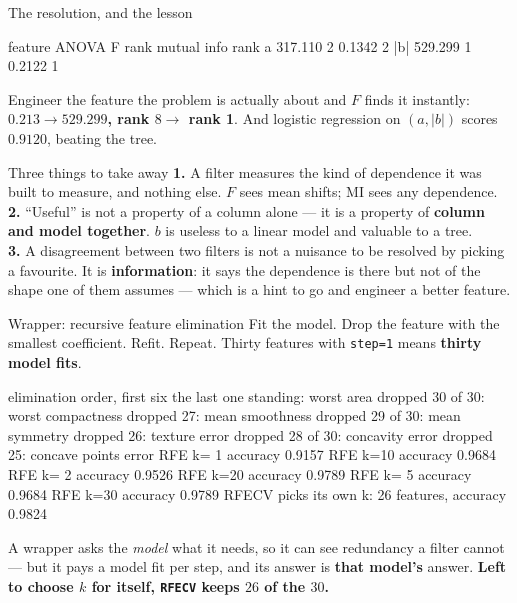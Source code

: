\documentclass[aspectratio=169]{beamer}
\begin{document}
\begin{frame}[fragile,shrink=6]{The resolution, and the lesson}
\begin{outblk}
feature             ANOVA F     rank  mutual info     rank
a                   317.110        2       0.1342        2
|b|                 529.299        1       0.2122        1
\end{outblk}
\vspace{0.1em}
Engineer the feature the problem is actually about and $F$ finds it
instantly: \textbf{$0.213 \rightarrow 529.299$, rank $8 \rightarrow$ rank 1}.
And logistic regression on $(a, |b|)$ scores $\mathbf{0.9120}$, beating the
tree.
\vspace{0.3em}
\begin{alertblock}{Three things to take away}
  \footnotesize
  \textbf{1.} A filter measures the kind of dependence it was built to
  measure, and nothing else. $F$ sees mean shifts; MI sees any dependence.\\
  \textbf{2.} ``Useful'' is not a property of a column alone --- it is a
  property of \textbf{column and model together}. $b$ is useless to a linear
  model and valuable to a tree.\\
  \textbf{3.} A disagreement between two filters is not a nuisance to be
  resolved by picking a favourite. It is \textbf{information}: it says the
  dependence is there but not of the shape one of them assumes --- which is a
  hint to go and engineer a better feature.
\end{alertblock}
\end{frame}

\begin{frame}[fragile,shrink=8]{Wrapper: recursive feature elimination}
Fit the model. Drop the feature with the smallest coefficient. Refit. Repeat.
Thirty features with \texttt{step=1} means \textbf{thirty model fits}.
\begin{outblk}
elimination order, first six      the last one standing: worst area
   dropped 30 of 30: worst compactness      dropped 27: mean smoothness
   dropped 29 of 30: mean symmetry          dropped 26: texture error
   dropped 28 of 30: concavity error        dropped 25: concave points error
   RFE k= 1  accuracy 0.9157      RFE k=10  accuracy 0.9684
   RFE k= 2  accuracy 0.9526      RFE k=20  accuracy 0.9789
   RFE k= 5  accuracy 0.9684      RFE k=30  accuracy 0.9789
   RFECV picks its own k: 26 features, accuracy 0.9824
\end{outblk}
\begin{center}\small
  A wrapper asks the \emph{model} what it needs, so it can see redundancy a
  filter cannot --- but it pays a model fit per step, and its answer is
  \textbf{that model's} answer. \textbf{Left to choose $k$ for itself,
  \texttt{RFECV} keeps $26$ of the $30$.}
\end{center}
\end{frame}
\end{document}
